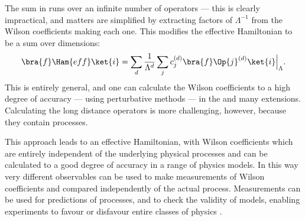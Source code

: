 The sum in  runs over an infinite number of operators --- this is clearly
impractical, and matters are simplified by
extracting factors of $\Lambda^{-1}$ from the Wilson coefficients
making each one.
This modifies the effective Hamiltonian to be a sum over dimensions:
\begin{equation}
  \bra{f}\Ham{eff}\ket{i} =
  \sum_{d}\frac{1}{\Lambda^{d}}
  \sum_j c_j^{(d)}\bra{f}\Op{j}^{(d)}\ket{i}\Big|_{\Lambda}.
  \label{eq:th:opehamnorm}
\end{equation}
This is entirely general, and one can calculate the Wilson coefficients to a high degree of
accuracy --- using perturbative methods --- in the \sm and many \bsm extensions.
Calculating the long distance operators is more challenging, however, because they contain \QCD
processes.

This approach leads to an effective Hamiltonian, with Wilson coefficients which are entirely
independent of the underlying physical processes and can be calculated to a good degree of accuracy
in a range of physics models.
In this way very different observables can be used to make measurements of Wilson coefficients and
compared independently of the actual process.
Measurements can be used for predictions of processes, and to check the validity of \np models,
enabling experiments to favour or disfavour entire classes of physics \bsm.

